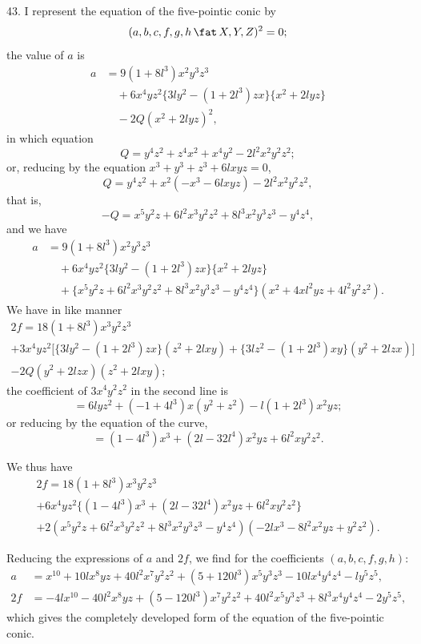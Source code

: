 \documentclass[11pt,a4paper]{article}
\theoremstyle{definition}
\begin{document}
43. I represent the equation of the five-pointic conic by
\[
(a,b,c,f,g,h\,\fat\, X,Y,Z)^2=0;
\]
the value of $a$ is
\begin{align*}
a &= 9(1+8l^3)x^2y^3z^3\\
&\quad +6x^4yz^2\{3ly^2-(1+2l^3)zx\}\{x^2+2lyz\}\\
&\quad -2Q(x^2+2lyz)^2,
\end{align*}
in which equation
\[
Q = y^4z^2+z^4x^2+x^4y^2-2l^2x^2y^2z^2;
\]
or, reducing by the equation $x^3+y^3+z^3+6lxyz=0$,
\[
Q = y^4z^2+x^2(-x^3-6lxyz)-2l^2x^2y^2z^2,
\]
that is,
\[
-Q = x^5y^2z+6l^2x^3y^2z^2+8l^3x^2y^3z^3-y^4z^4,
\]
and we have
\begin{align*}
a &= 9(1+8l^3)x^2y^3z^3\\
&\quad +6x^4yz^2\{3ly^2-(1+2l^3)zx\}\{x^2+2lyz\}\\
&\quad +\{x^5y^2z+6l^2x^3y^2z^2+8l^3x^2y^3z^3-y^4z^4\}(x^2+4xl^2yz+4l^2y^2z^2).
\end{align*}
We have in like manner
\begin{multline*}
2f = 18(1+8l^3)x^3y^2z^3\\
+3x^4yz^2\bigl[\{3ly^2-(1+2l^3)zx\}(z^2+2lxy)+\{3lz^2-(1+2l^3)xy\}(y^2+2lzx)\bigr]\\
-2Q(y^2+2lzx)(z^2+2lxy);
\end{multline*}
the coefficient of $3x^4y^2z^2$ in the second line is
\[
= 6lyz^2+(-1+4l^3)x(y^2+z^2)-l(1+2l^3)x^2yz;
\]
or reducing by the equation of the curve,
\[
= (1-4l^3)x^3+(2l-32l^4)x^2yz+6l^2xy^2z^2.
\]

We thus have
\begin{multline*}
2f=18(1+8l^3)x^3y^2z^3\\
+6x^4yz^2\{(1-4l^3)x^3+(2l-32l^4)x^2yz+6l^2xy^2z^2\}\\
+2(x^5y^2z+6l^2x^3y^2z^2+8l^3x^2y^3z^3-y^4z^4)(-2lx^3-8l^2x^2yz+y^2z^2).
\end{multline*}

Reducing the expressions of $a$ and $2f$, we find for the coefficients $(a,b,c,f,g,h)$:
\begin{align*}
a &= x^{10}+10lx^8yz+40l^2x^7y^2z^2+(5+120l^3)x^5y^3z^3-10lx^4y^4z^4-ly^5z^5,\\
2f &= -4lx^{10}-40l^2x^8yz+(5-120l^3)x^7y^2z^2+40l^2x^5y^3z^3+8l^3x^4y^4z^4-2y^5z^5,
\end{align*}
which gives the completely developed form of the equation of the five-pointic conic.
\end{document}
